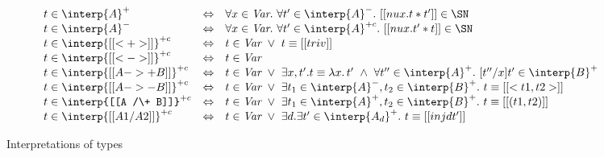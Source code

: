 \begin{figure}
\small
\[
\begin{array}{lll}
t \in \interp{A}^+ & \Leftrightarrow & \forall x \in \textit{Var}.\ \forall t'\in\interp{A}^-.\ [[ nu x . t * t' ]] \in \SN\\
t \in \interp{A}^- & \Leftrightarrow & \forall x \in \textit{Var}.\ \forall t'\in\interp{A}^{+c}.\ [[ nu x . t' * t ]] \in \SN\\
t \in \interp{[[< + >]]}^{+c} & \Leftrightarrow & t \in \textit{Var}\ \vee\ t \equiv [[triv]] \\
t \in \interp{[[< - >]]}^{+c} & \Leftrightarrow & t \in \textit{Var}\\
t \in \interp{[[A ->+ B]]}^{+c} & \Leftrightarrow & t \in \textit{Var}\ \vee\ \exists x, t'. t \equiv \lambda x.\, t'\ \wedge\ \forall t''\in\interp{A}^+.\ [t''/x] t'\in\interp{B}^+\\
t \in \interp{[[A ->- B]]}^{+c} & \Leftrightarrow & t \in \textit{Var}\ \vee\ \exists t_1\in\interp{A}^-, t_2\in\interp{B}^+.\ t \equiv [[ < t1 , t2 >]] \\
t \in \interp{[[A /\+ B]]}^{+c} & \Leftrightarrow & t \in \textit{Var}\ \vee\ \exists t_1\in\interp{A}^+, t_2\in\interp{B}^+.\ t \equiv [[ ( t1 , t2 )]] \\
t \in \interp{[[A1 /\- A2]]}^{+c} & \Leftrightarrow & t \in \textit{Var}\ \vee\ \exists d. \exists t'\in\interp{A_d}^+.\ t \equiv [[ inj d t']] 
\end{array}
\]
\caption{Interpretations of types}
\label{fig:classreal}
\end{figure}

